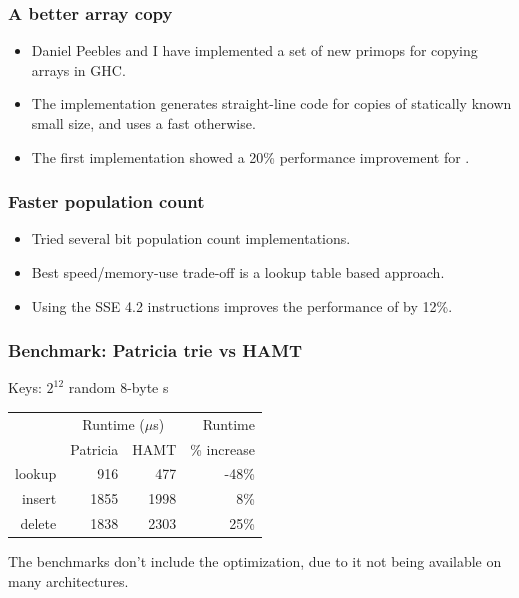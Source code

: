 \documentclass[xetex,mathserif,serif]{beamer}
\newcommand{\code}[1]{\mbox{\texttt{\small{\color{CodeColor}{#1}}}}}
\begin{document}
\begin{frame}
  \frametitle{A better array copy}

  \begin{itemize}
  \item Daniel Peebles and I have implemented a set of new primops for
    copying arrays in GHC.
  \item The implementation generates straight-line code for copies of
    statically known small size, and uses a fast \code{memcpy}
    otherwise.
  \item The first implementation showed a 20\% performance improvement
    for \code{insert}.
  \end{itemize}
\end{frame}

\begin{frame}
  \frametitle{Faster population count}
  \begin{itemize}
  \item Tried several bit population count implementations.
  \item Best speed/memory-use trade-off is a lookup table based
    approach.
  \item Using the \code{POPCNT} SSE 4.2 instructions improves the
    performance of \code{lookup} by 12\%.
  \end{itemize}
\end{frame}

\begin{frame}
  \frametitle{Benchmark: Patricia trie vs HAMT}

  Keys: $2^{12}$ random 8-byte \code{ByteString}s

  \bigskip
  \begin{center}
  \begin{tabular}{r|rrr}
                  & \multicolumn{2}{c}{Runtime ($\mu$s)} & Runtime \\
                  & Patricia & HAMT                      & \% increase \\
    \hline lookup &  916 &  477 & -48\% \\
           insert & 1855 & 1998 & 8\% \\
           delete & 1838 & 2303 & 25\% \\
  \end{tabular}
  \end{center}

  The benchmarks don't include the \code{POPCNT} optimization, due to
  it not being available on many architectures.
\end{frame}
\end{document}

